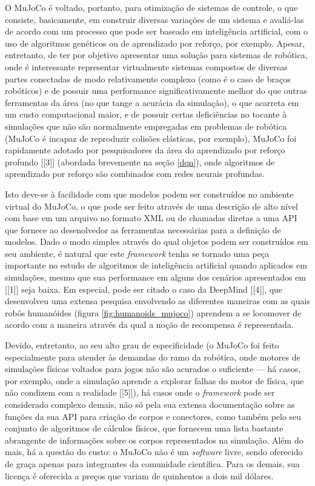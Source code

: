 \documentclass[cic,tc]{iiufrgs}
\begin{document}
O MuJoCo é voltado, portanto, para otimização de sistemas de controle, o que
consiste, basicamente, em construir diversas variações de um sistema e
avaliá-las de acordo com um processo que pode ser baseado em inteligência
artificial, com o uso de algoritmos genéticos ou de aprendizado por reforço, por
exemplo. Apesar, entretanto, de ter por objetivo apresentar uma solução para
sistemas de robótica, onde é interessante representar virtualmente sistemas
compostos de diversas partes conectadas de modo relativamente complexo (como é
o caso de braços robóticos) e de possuir uma performance significativamente
melhor do que outras ferramentas da área (no que tange a acurácia da simulação),
o que acarreta em um custo computacional maior, e de possuir certas deficiências
no tocante à simulações que não são normalmente empregadas em problemas de
robótica (MuJoCo é incapaz de reproduzir colisões elásticas, por exemplo),
MuJoCo foi rapidamente
adotado por pesquisadores da área do aprendizado por reforço profundo [[3]]
(abordada brevemente na seção \ref{dqn}), onde algoritmos de aprendizado por
reforço são combinados com redes neurais profundas.


Isto deve-se à facilidade com que modelos podem ser construídos no ambiente
virtual do MuJoCo, o que pode ser feito através de uma descrição de alto nível com
base em um arquivo no formato XML ou de chamadas diretas a uma API que fornece
ao desenolvedor as ferramentas necessárias para a definição de modelos. Dado o
modo simples através do qual objetos podem ser construídos em seu ambiente, é
natural que este \textit{framework} tenha se tornado uma peça importante no
estudo de algoritmos de inteligência artificial quando aplicados em simulações,
mesmo que sua performance em alguns dos cenários apresentados em [[1]] seja
baixa.
Em especial, pode ser citado o caso da DeepMind [[4]], que desenvolveu uma
extensa pesquisa envolvendo as diferentes maneiras com as quais robôs humanóides
(figura \ref{fig:humanoids_mujoco}) aprendem a se locomover de acordo com a
maneira através da qual a noção de recompensa é representada.


Devido, entretanto, ao seu alto grau de especificidade (o MuJoCo foi feito
especialmente para atender às demandas do ramo da robótica, onde motores de
simulações físicas voltados para jogos não são acurados o suficiente --- há
casos, por exemplo, onde a simulação aprende a explorar falhas do motor de
física, que não condizem com a realidade [[5]]), há casos onde o
\textit{framework} pode ser considerado complexo demais, não só pela sua
extensa documentação sobre as funções da sua API para criação de corpos e
conectores, como também pelo seu conjunto de algoritmos de cálculos físicos, que
fornecem uma lista bastante abrangente de informações sobre os corpos
representados na simulação. Além do mais, há a questão do custo: o MuJoCo não
é um \textit{software} livre, sendo oferecido de graça apenas para integrantes
da comunidade científica. Para os demais, sua licença é oferecida a preços que
variam de quinhentos a dois mil dólares.
\end{document}
